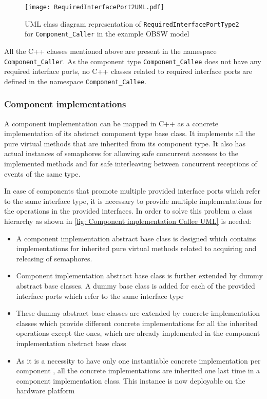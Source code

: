 \begin{figure}[h]
	\centering
	\texttt{[image: RequiredInterfacePort2UML.pdf]}
	\caption{UML class diagram representation of \texttt{Required\allowbreak InterfacePort\allowbreak Type2} for \texttt{Component\allowbreak\_Caller} in the example OBSW model}
	\label{fig: Required interface port2 UML}
\end{figure}

All the C++ classes mentioned above are present in the namespace \texttt{Component\allowbreak\_Caller}. As the component type \texttt{Component\allowbreak\_Callee} does not have any required interface ports, no C++ classes related to required interface ports are defined in the namespace \texttt{Component\allowbreak\_Callee}. 

\subsubsection{\textbf{Component implementations}}
A component implementation can be mapped in C++ as a concrete implementation of its abstract component type base class. It implements all the pure virtual methods that are inherited from its component type. It also has actual instances of semaphores for allowing safe concurrent accesses to the implemented methods and for safe interleaving between concurrent receptions of events of the same type.

In case of components that promote multiple provided interface ports which refer to the same interface type, it is necessary to provide multiple implementations for the operations in the provided interfaces. In order to solve this problem a class hierarchy as shown in \cref{fig: Component implementation Callee UML} is needed:

\begin{itemize}
\item A component implementation abstract base class is designed which contains implementations for inherited pure virtual methods related to acquiring and releasing of semaphores.
\item Component implementation abstract base class is further extended by dummy abstract base classes. A dummy base class is added for each of the provided interface ports which refer to the same interface type
\item These dummy abstract base classes are extended by concrete implementation classes which provide different concrete implementations for all the inherited operations except the ones, which are already implemented in the component implementation abstract base class
\item As it is a necessity to have only one instantiable concrete implementation per component \cite{EvoRAVCodeAr,SpecMetamodel,CompBasedProcess}, all the concrete implementations are inherited one last time in a component implementation class. This instance is now deployable on the hardware platform
\end{itemize}
 
